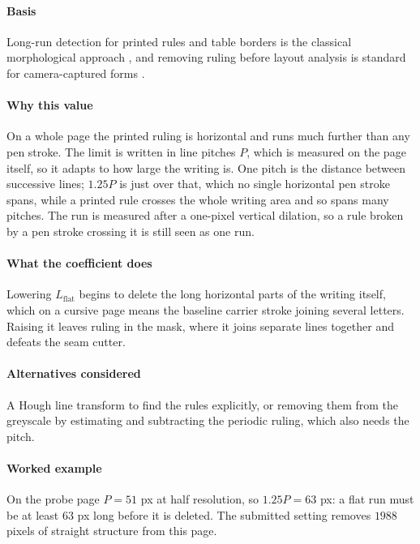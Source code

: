\paragraph{Basis}

Long-run detection for printed rules and table borders is the classical morphological approach \cite{haralick1987}, and removing ruling before layout analysis is standard for camera-captured forms \cite{shafait2008}.

\paragraph{Why this value}

On a whole page the printed ruling is horizontal and runs much further than any pen stroke. The limit is written in line pitches $P$, which is measured on the page itself, so it adapts to how large the writing is. One pitch is the distance between successive lines; $1.25P$ is just over that, which no single horizontal pen stroke spans, while a printed rule crosses the whole writing area and so spans many pitches. The run is measured after a one-pixel vertical dilation, so a rule broken by a pen stroke crossing it is still seen as one run.

\paragraph{What the coefficient does}

Lowering $L_{\text{flat}}$ begins to delete the long horizontal parts of the writing itself, which on a cursive page means the baseline carrier stroke joining several letters. Raising it leaves ruling in the mask, where it joins separate lines together and defeats the seam cutter.

\paragraph{Alternatives considered}

A Hough line transform \cite{duda1972} to find the rules explicitly, or removing them from the greyscale by estimating and subtracting the periodic ruling, which also needs the pitch.

\paragraph{Worked example}

On the probe page $P = 51$ px at half resolution, so $1.25P = 63$ px: a flat run must be at least $63$ px long before it is deleted. The submitted setting removes $1988$ pixels of straight structure from this page.

